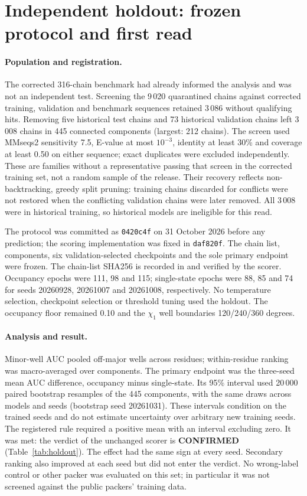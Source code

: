 \documentclass[10pt,a4paper]{article}
\begin{document}
\section{Independent holdout: frozen protocol and first read}
\label{sec:holdout}

\paragraph{Population and registration.} The corrected 316-chain benchmark had already
informed the analysis and was not an independent test. Screening the 9\,020 quarantined
chains against corrected training, validation and benchmark sequences retained 3\,086
without qualifying hits. Removing five historical test chains and 73 historical
validation chains left 3\,008 chains in 445 connected components (largest: 212 chains).
The screen used MMseqs2 sensitivity 7.5, E-value at most $10^{-3}$, identity at least
30\% and coverage at least 0.50 on either sequence; exact duplicates were excluded
independently. These are families without a representative passing that screen in the
corrected training set, not a random sample of the release. Their recovery reflects
non-backtracking, greedy split pruning: training chains discarded for conflicts were
not restored when the conflicting validation chains were later removed. All 3\,008
were in historical training, so historical models are ineligible for this read.

The protocol was committed as \texttt{0420c4f} on 31 October 2026 before any prediction;
the scoring implementation was fixed in \texttt{daf820f}. The chain list, components,
six validation-selected checkpoints and the sole primary endpoint were frozen. The
chain-list SHA256 is recorded in  and verified
by the scorer. Occupancy epochs were 111, 98 and 115; single-state epochs were 88, 85
and 74 for seeds 20260928, 20261007 and 20261008, respectively. No temperature selection, checkpoint selection or threshold tuning used the holdout. The occupancy floor remained
0.10 and the $\chi_1$ well boundaries 120/240/360 degrees.

\paragraph{Analysis and result.} Minor-well AUC pooled off-major wells across residues;
within-residue ranking was macro-averaged over components. The primary endpoint was the
three-seed mean AUC difference, occupancy minus single-state. Its 95\% interval used
20\,000 paired bootstrap resamples of the 445 components, with the same draws across
models and seeds (bootstrap seed 20261031). These intervals condition on the trained
seeds and do not estimate uncertainty over arbitrary new training seeds. The registered
rule required a positive mean with an interval excluding zero. It was met: the verdict
of the unchanged scorer is \textbf{CONFIRMED} (Table~\ref{tab:holdout}). The effect had
the same sign at every seed. Secondary ranking also improved at each seed but did not
enter the verdict. No wrong-label control or other packer was evaluated on this set;
in particular it was not screened against the public packers' training data.
\end{document}

